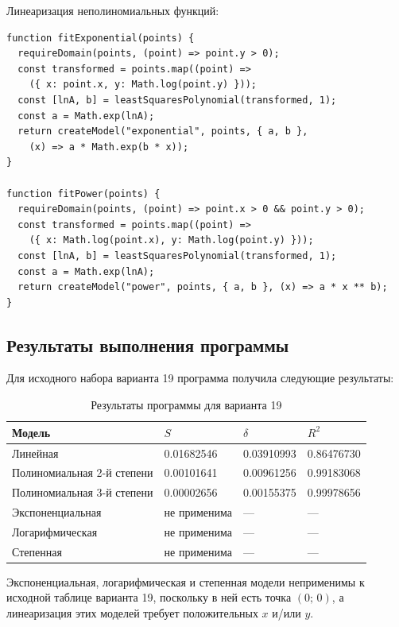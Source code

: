 \documentclass[12pt,a4paper]{article}
\begin{document}
Линеаризация неполиномиальных функций:

\begin{lstlisting}
function fitExponential(points) {
  requireDomain(points, (point) => point.y > 0);
  const transformed = points.map((point) =>
    ({ x: point.x, y: Math.log(point.y) }));
  const [lnA, b] = leastSquaresPolynomial(transformed, 1);
  const a = Math.exp(lnA);
  return createModel("exponential", points, { a, b },
    (x) => a * Math.exp(b * x));
}

function fitPower(points) {
  requireDomain(points, (point) => point.x > 0 && point.y > 0);
  const transformed = points.map((point) =>
    ({ x: Math.log(point.x), y: Math.log(point.y) }));
  const [lnA, b] = leastSquaresPolynomial(transformed, 1);
  const a = Math.exp(lnA);
  return createModel("power", points, { a, b }, (x) => a * x ** b);
}
\end{lstlisting}

\subsection{Результаты выполнения программы}

Для исходного набора варианта 19 программа получила следующие результаты:

\begin{table}[H]
  \centering
  \caption{Результаты программы для варианта 19}
  \begin{tabular}{C{4.7cm}C{2.4cm}C{2.4cm}C{2.8cm}}
    \toprule
    \textbf{Модель} & \textbf{$S$} & \textbf{$\delta$} & \textbf{$R^2$} \\
    \midrule
    Линейная & 0.01682546 & 0.03910993 & 0.86476730 \\
    Полиномиальная 2-й степени & 0.00101641 & 0.00961256 & 0.99183068 \\
    Полиномиальная 3-й степени & 0.00002656 & 0.00155375 & 0.99978656 \\
    Экспоненциальная & не применима & --- & --- \\
    Логарифмическая & не применима & --- & --- \\
    Степенная & не применима & --- & --- \\
    \bottomrule
  \end{tabular}
\end{table}

Экспоненциальная, логарифмическая и степенная модели неприменимы к исходной таблице
варианта 19, поскольку в ней есть точка $(0;\,0)$, а линеаризация этих моделей требует
положительных $x$ и/или $y$.
\end{document}
